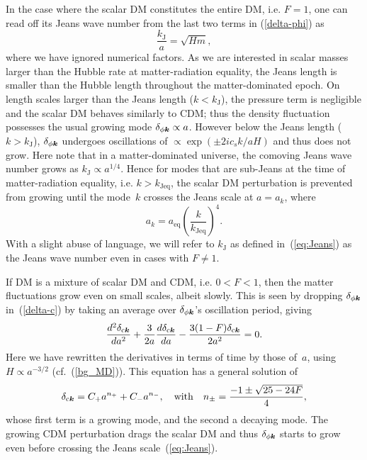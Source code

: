 \documentclass[11pt,nofootinbib]{article}
\numberwithin{equation}{section}
\begin{document}
In the case where the scalar DM constitutes the entire DM, i.e. $F = 1$,
one can read off its Jeans wave number from the last two terms in
(\ref{delta-phi}) as
\begin{equation}
 \frac{k_{\mathrm{J}}}{a} = \sqrt{Hm},
\label{eq:Jeans}
\end{equation}
where we have ignored numerical factors.
As we are interested in scalar masses larger than the Hubble rate
at matter-radiation equality, the Jeans length is smaller than the
Hubble length throughout the matter-dominated epoch.
On length scales larger than the Jeans length ($k < k_{\mathrm{J}}$),
the pressure term is negligible and the scalar DM behaves similarly to CDM;
thus the density fluctuation possesses the usual growing mode 
$\delta_{\phi \boldsymbol{k}} \propto a$.
However below the Jeans length ($k > k_{\mathrm{J}}$),
$\delta_{\phi \boldsymbol{k}}$ undergoes oscillations of
$ \propto \exp (\pm 2 i c_s k / a H)$
and thus does not grow.
Here note that in a matter-dominated universe, 
the comoving Jeans wave number grows as $k_{\mathrm{J}} \propto a^{1/4}$.
Hence for modes that are sub-Jeans at the time of
matter-radiation equality, i.e. $k > k_{\mathrm{Jeq}}$,
the scalar DM perturbation is prevented from growing until the mode~$k$
crosses the Jeans scale at $a = a_k$, where
\begin{equation}
 a_k = a_{\mathrm{eq}} \left( \frac{k}{k_{\mathrm{J eq}}} \right)^{4}.
\label{a_k}
\end{equation}
With a slight abuse of language, we will refer to $k_\mathrm{J}$ as
defined in~(\ref{eq:Jeans}) as the Jeans wave number even in
cases with $F \neq 1$.


If DM is a mixture of scalar DM and CDM, i.e. $0 <
F < 1$, then the matter fluctuations grow even on small scales,
albeit slowly.
This is seen by dropping $\delta_{\phi \boldsymbol{k}}$
in~(\ref{delta-c}) by
taking an average over $\delta_{\phi \boldsymbol{k}}$'s oscillation period, giving
\begin{equation}
  \frac{d^2 \delta_{\mathrm{c} \boldsymbol{k}} }{d a^2} +
 \frac{3}{2a }\frac{d \delta_{\mathrm{c} \boldsymbol{k}} }{d a}
 - \frac{3 (1-F) \delta_{\mathrm{c}\boldsymbol{k}}}{2 a^2 } = 0.
\end{equation}
Here we have rewritten the derivatives in terms of time by those of~$a$,
using $H \propto a^{-3/2}$ (cf.~(\ref{bg_MD})).
This equation has a general solution of
\begin{equation}
 \delta_{\mathrm{c} \boldsymbol{k}} = C_+ a^{n_+} + C_- a^{n_-},
  \quad
  \mathrm{with}
  \quad
  n_{\pm} = \frac{-1 \pm \sqrt{25 - 24 F} }{4},
  \label{n_pm}
\end{equation}
whose first term is a growing mode, and the second a decaying mode.
The growing CDM perturbation drags the scalar DM and thus $\delta_{\phi
\boldsymbol{k}}$ starts to grow even before crossing the Jeans
scale~(\ref{eq:Jeans}). 
\end{document}
